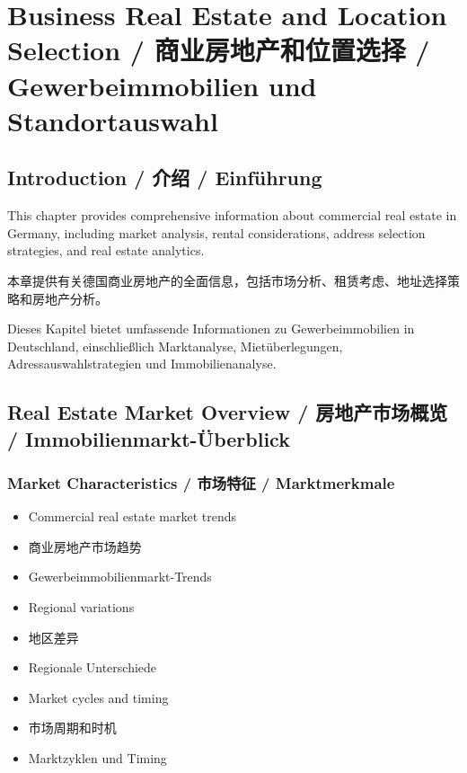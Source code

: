 \chapter{Business Real Estate and Location Selection / 商业房地产和位置选择 / Gewerbeimmobilien und Standortauswahl}

\section{Introduction / 介绍 / Einführung}

This chapter provides comprehensive information about commercial real estate in Germany, including market analysis, rental considerations, address selection strategies, and real estate analytics.

本章提供有关德国商业房地产的全面信息，包括市场分析、租赁考虑、地址选择策略和房地产分析。

Dieses Kapitel bietet umfassende Informationen zu Gewerbeimmobilien in Deutschland, einschließlich Marktanalyse, Mietüberlegungen, Adressauswahlstrategien und Immobilienanalyse.

\section{Real Estate Market Overview / 房地产市场概览 / Immobilienmarkt-Überblick}

\subsection{Market Characteristics / 市场特征 / Marktmerkmale}
\begin{itemize}
    \item Commercial real estate market trends
    \item 商业房地产市场趋势
    \item Gewerbeimmobilienmarkt-Trends
    \item Regional variations
    \item 地区差异
    \item Regionale Unterschiede
    \item Market cycles and timing
    \item 市场周期和时机
    \item Marktzyklen und Timing
\end{itemize}

